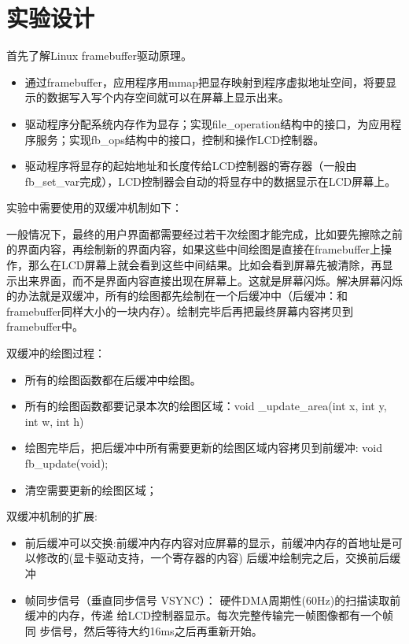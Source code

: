 \documentclass{report}
\begin{document}
\section{实验设计}
\par 首先了解Linux framebuffer驱动原理。
\begin{itemize}
    \item 通过framebuffer，应用程序用mmap把显存映射到程序虚拟地址空间，将要显示的数据写入写个内存空间就可以在屏幕上显示出来。
    \item 驱动程序分配系统内存作为显存；实现file\_operation结构中的接口，为应用程序服务；实现fb\_ops结构中的接口，控制和操作LCD控制器。
    \item 驱动程序将显存的起始地址和长度传给LCD控制器的寄存器（一般由fb\_set\_var完成），LCD控制器会自动的将显存中的数据显示在LCD屏幕上。
\end{itemize}

\par 实验中需要使用的双缓冲机制如下：
\par 一般情况下，最终的用户界面都需要经过若干次绘图才能完成，比如要先擦除之前的界面内容，再绘制新的界面内容，如果这些中间绘图是直接在framebuffer上操作，那么在LCD屏幕上就会看到这些中间结果。比如会看到屏幕先被清除，再显示出来界面，而不是界面内容直接出现在屏幕上。这就是屏幕闪烁。解决屏幕闪烁的办法就是双缓冲，所有的绘图都先绘制在一个后缓冲中（后缓冲：和framebuffer同样大小的一块内存）。绘制完毕后再把最终屏幕内容拷贝到framebuffer中。

\par 双缓冲的绘图过程：

\begin{itemize}
    \item 所有的绘图函数都在后缓冲中绘图。
    \item 所有的绘图函数都要记录本次的绘图区域：void \_update\_area(int x, int y, int w, int h)
    \item 绘图完毕后，把后缓冲中所有需要更新的绘图区域内容拷贝到前缓冲: void fb\_update(void);
    \item 清空需要更新的绘图区域；
\end{itemize}

\par 双缓冲机制的扩展:
\begin{itemize}
    \item 前后缓冲可以交换:前缓冲内存内容对应屏幕的显示，前缓冲内存的首地址是可以修改的(显卡驱动支持，一个寄存器的内容) 后缓冲绘制完之后，交换前后缓冲
    \item 帧同步信号（垂直同步信号 VSYNC）： 硬件DMA周期性(60Hz)的扫描读取前缓冲的内存，传递 给LCD控制器显示。每次完整传输完一帧图像都有一个帧同 步信号，然后等待大约16ms之后再重新开始。
\end{itemize}
\end{document}
